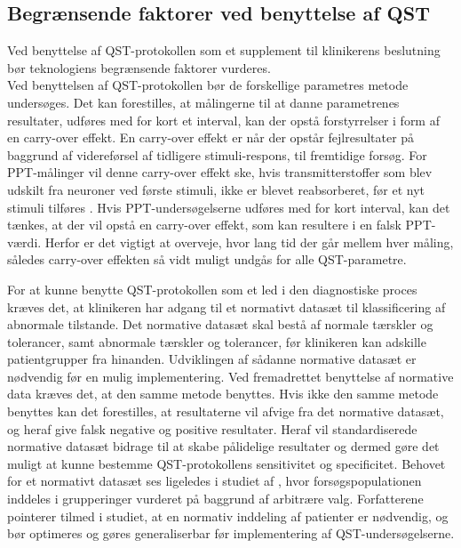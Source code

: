 \subsection{Begrænsende faktorer ved benyttelse af QST}
Ved benyttelse af QST-protokollen som et supplement til klinikerens beslutning bør teknologiens begrænsende faktorer vurderes. \\
Ved benyttelsen af QST-protokollen bør de forskellige parametres metode undersøges. Det kan forestilles, at målingerne til at danne parametrenes resultater, udføres med for kort et interval, kan der opstå forstyrrelser i form af en carry-over effekt. En carry-over effekt er når der opstår fejlresultater på baggrund af videreførsel af tidligere stimuli-respons, til fremtidige forsøg. \citep{Porta2008} For PPT-målinger vil denne carry-over effekt ske, hvis transmitterstoffer som blev udskilt fra neuroner ved første stimuli, ikke er blevet reabsorberet, før et nyt stimuli tilføres \citep{Martini2012}. Hvis PPT-undersøgelserne udføres med for kort interval, kan det tænkes, at der vil opstå en carry-over effekt, som kan resultere i en falsk PPT-værdi. Herfor er det vigtigt at overveje, hvor lang tid der går mellem hver måling, således carry-over effekten så vidt muligt undgås for alle QST-parametre. \citep{Porta2008} 

For at kunne benytte QST-protokollen som et led i den diagnostiske proces kræves det, at klinikeren har adgang til et normativt datasæt til klassificering af abnormale tilstande. Det normative datasæt skal bestå af normale tærskler og tolerancer, samt abnormale tærskler og tolerancer, før klinikeren kan adskille patientgrupper fra hinanden. Udviklingen af sådanne normative datasæt er nødvendig før en mulig implementering. Ved fremadrettet benyttelse af normative data kræves det, at den samme metode benyttes. Hvis ikke den samme metode benyttes kan det forestilles, at resultaterne vil afvige fra det normative datasæt, og heraf give falsk negative og positive resultater. Heraf vil standardiserede normative datasæt bidrage til at skabe pålidelige resultater og dermed gøre det muligt at kunne bestemme QST-protokollens sensitivitet og specificitet. \citep{Yarnitsky1997} Behovet for et normativt datasæt ses ligeledes i studiet af , hvor forsøgspopulationen inddeles i grupperinger vurderet på baggrund af arbitrære valg. Forfatterene pointerer tilmed i studiet, at en normativ inddeling af patienter er nødvendig, og bør optimeres og gøres generaliserbar før implementering af QST-undersøgelserne. \citep{Petersen2016} 

